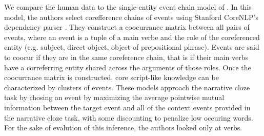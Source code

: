 \documentclass[10pt,a4paper]{article}
\begin{document}
We compare the human data to the single-entity event chain model of . In this model, the authors select corefference chains of events using Stanford CoreNLP's dependency parser \cite{corenlp,depparse}. They construct a coocurrance matrix between all pairs of events, where an event is a tuple of a main verbe and the role of the coreferenced entity (e.g. subject, direct object, object of prepositional phrase). Events are said to coocur if they are in the same coreference chain, that is if their main verbs have a correferring entity shared across the arguments of those roles. Once the coocurrance matrix is constructed, core script-like knowledge can be characterized by clusters of events. These models approach the narrative cloze task by chosing an event by maximizing the average pointwise mutual information between the target event and all of the context events provided in the narrative cloze task, with some discounting to penalize low occuring words. For the sake of evalution of this inference, the authors looked only at verbs.
\end{document}
